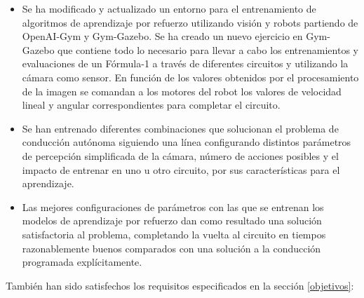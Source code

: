 \begin{itemize}
    \item Se ha modificado y actualizado un entorno para el entrenamiento de algoritmos de aprendizaje por refuerzo utilizando visión y robots partiendo de OpenAI-Gym y Gym-Gazebo. Se ha creado un nuevo ejercicio en Gym-Gazebo que contiene todo lo necesario para llevar a cabo los entrenamientos y evaluaciones de un Fórmula-1 a través de diferentes circuitos y utilizando la cámara como sensor. En función de los valores obtenidos por el procesamiento de la imagen se comandan a los motores del robot los valores de velocidad lineal y angular correspondientes para completar el circuito.\\
    
    \item Se han entrenado diferentes combinaciones que solucionan el problema de conducción autónoma siguiendo una línea configurando distintos parámetros de percepción simplificada de la cámara, número de acciones posibles y el impacto de entrenar en uno u otro circuito, por sus características para el aprendizaje.\\
    
    \item Las mejores configuraciones de parámetros con las que se entrenan los modelos de aprendizaje por refuerzo dan como resultado una solución satisfactoria al problema, completando la vuelta al circuito en tiempos razonablemente buenos comparados con una solución a la conducción programada explícitamente.\\
\end{itemize}



También han sido satisfechos los requisitos especificados en la sección \ref{objetivos}:\\

